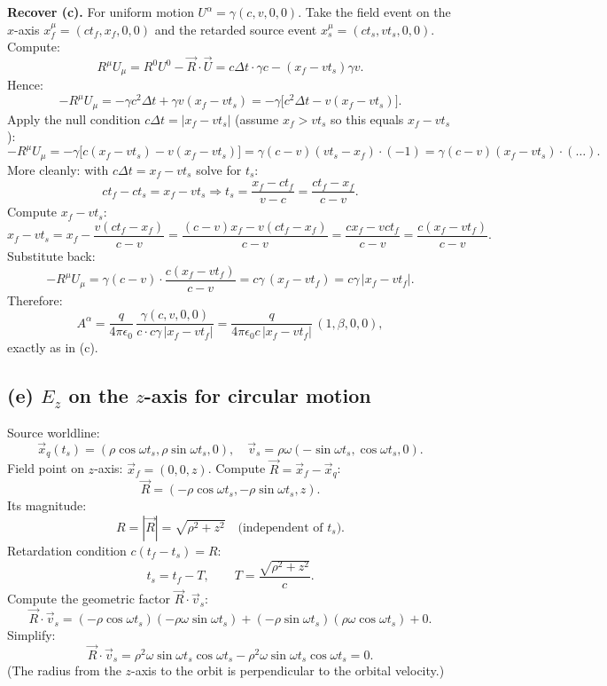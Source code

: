 \documentclass[11pt]{article}
\begin{document}
\textbf{Recover (c).} For uniform motion $U^{\alpha}=\gamma(c,v,0,0)$. Take the field event on the $x$-axis $x_{f}^{\mu}=(ct_{f},x_{f},0,0)$ and the retarded source event $x_{s}^{\mu}=(ct_{s},vt_{s},0,0)$. Compute:
\[ R^{\mu}U_{\mu}=R^{0}U^{0}-\vec R\!\cdot\!\vec U=c\Delta t\cdot\gamma c-(x_{f}-vt_{s})\gamma v. \]
Hence:
\[ -R^{\mu}U_{\mu}=-\gamma c^{2}\Delta t+\gamma v(x_{f}-vt_{s})=-\gamma\big[c^{2}\Delta t-v(x_{f}-vt_{s})\big]. \]
Apply the null condition $c\Delta t=|x_{f}-vt_{s}|$ (assume $x_{f}>vt_{s}$ so this equals $x_{f}-vt_{s}$):
\[ -R^{\mu}U_{\mu}=-\gamma\big[c(x_{f}-vt_{s})-v(x_{f}-vt_{s})\big]=\gamma(c-v)(vt_{s}-x_{f})\cdot(-1)=\gamma(c-v)(x_{f}-vt_{s})\cdot(\ldots). \]
More cleanly: with $c\Delta t=x_{f}-vt_{s}$ solve for $t_{s}$:
\[ ct_{f}-ct_{s}=x_{f}-vt_{s}\Rightarrow t_{s}=\frac{x_{f}-ct_{f}}{v-c}=\frac{ct_{f}-x_{f}}{c-v}. \]
Compute $x_{f}-vt_{s}$:
\[ x_{f}-vt_{s}=x_{f}-\frac{v(ct_{f}-x_{f})}{c-v}=\frac{(c-v)x_{f}-v(ct_{f}-x_{f})}{c-v}=\frac{cx_{f}-vct_{f}}{c-v}=\frac{c(x_{f}-vt_{f})}{c-v}. \]
Substitute back:
\[ -R^{\mu}U_{\mu}=\gamma(c-v)\cdot\frac{c(x_{f}-vt_{f})}{c-v}=c\gamma\,(x_{f}-vt_{f})=c\gamma\,|x_{f}-vt_{f}|. \]
Therefore:
\[ A^{\alpha}=\frac{q}{4\pi\epsilon_{0}}\,\frac{\gamma(c,v,0,0)}{c\cdot c\gamma\,|x_{f}-vt_{f}|}=\frac{q}{4\pi\epsilon_{0}c\,|x_{f}-vt_{f}|}\,(1,\beta,0,0), \]
exactly as in (c).

\subsection*{(e) $E_{z}$ on the $z$-axis for circular motion}

Source worldline:
\[ \vec x_{q}(t_{s})=(\rho\cos\omega t_{s},\rho\sin\omega t_{s},0),\quad \vec v_{s}=\rho\omega(-\sin\omega t_{s},\cos\omega t_{s},0). \]
Field point on $z$-axis: $\vec x_{f}=(0,0,z)$. Compute $\vec R=\vec x_{f}-\vec x_{q}$:
\[ \vec R=(-\rho\cos\omega t_{s},-\rho\sin\omega t_{s},z). \]
Its magnitude:
\[ R=|\vec R|=\sqrt{\rho^{2}+z^{2}}\quad\text{(independent of $t_{s}$)}. \]
Retardation condition $c(t_{f}-t_{s})=R$:
\[ t_{s}=t_{f}-T,\qquad T=\frac{\sqrt{\rho^{2}+z^{2}}}{c}. \]
Compute the geometric factor $\vec R\!\cdot\!\vec v_{s}$:
\[ \vec R\!\cdot\!\vec v_{s}=(-\rho\cos\omega t_{s})(-\rho\omega\sin\omega t_{s})+(-\rho\sin\omega t_{s})(\rho\omega\cos\omega t_{s})+0. \]
Simplify:
\[ \vec R\!\cdot\!\vec v_{s}=\rho^{2}\omega\sin\omega t_{s}\cos\omega t_{s}-\rho^{2}\omega\sin\omega t_{s}\cos\omega t_{s}=0. \]
(The radius from the $z$-axis to the orbit is perpendicular to the orbital velocity.)
\end{document}
